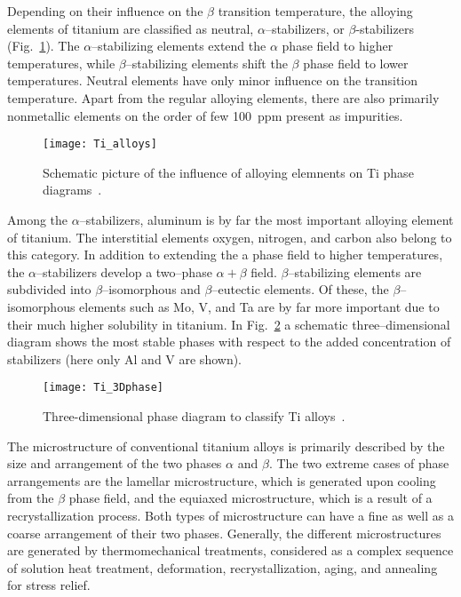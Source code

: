 Depending on their influence on the $\beta$ transition temperature, the alloying elements of titanium are classified as neutral, $\alpha$--stabilizers, or $\beta$-stabilizers (Fig.~\ref{fig:Ti_alloys}). The $\alpha$--stabilizing elements extend the $\alpha$ phase field to higher temperatures, while $\beta$--stabilizing elements shift the $\beta$ phase field to lower temperatures. Neutral elements have only minor influence on the transition temperature. Apart from the regular alloying elements, there are also primarily nonmetallic elements on the order of few \SI{100}{ppm} present as impurities.
\begin{figure}[tb]
    \centering
    \texttt{[image: Ti\_alloys]}
    \caption{Schematic picture of the influence of alloying elemnents on Ti phase diagrams~\cite{LeyensBOOK2003}.}
    \label{fig:Ti_alloys}
\end{figure}

Among the $\alpha$--stabilizers, aluminum is by far the most important alloying element of titanium. The interstitial elements oxygen, nitrogen, and carbon also belong to this category. In addition to extending the a phase field to higher temperatures, the $\alpha$--stabilizers develop a two--phase $\alpha+\beta$ field. $\beta$--stabilizing elements are subdivided into $\beta$--isomorphous and $\beta$--eutectic elements. Of these, the $\beta$--isomorphous elements such as Mo, V, and Ta are by far more important due to their much higher solubility in titanium. In Fig.~\ref{fig:Ti_phase} a schematic three--dimensional diagram shows the most stable phases with respect to the added concentration of stabilizers (here only Al and V are shown).
\begin{figure}[bt]
    \centering
    \texttt{[image: Ti\_3Dphase]}
    \caption{Three-dimensional phase diagram to classify Ti alloys~\cite{LeyensBOOK2003}.}
    \label{fig:Ti_phase}
\end{figure}

The microstructure of conventional titanium alloys is primarily described by the size and arrangement of the two phases $\alpha$ and $\beta$. The two extreme cases of phase arrangements are the lamellar microstructure, which is generated upon cooling from the $\beta$ phase field, and the equiaxed microstructure, which is a result of a recrystallization process. Both types of microstructure can have a fine as well as a coarse arrangement of their two phases. Generally, the different microstructures are generated by thermomechanical treatments, considered as a complex sequence of solution heat treatment, deformation, recrystallization, aging, and annealing for stress relief.

